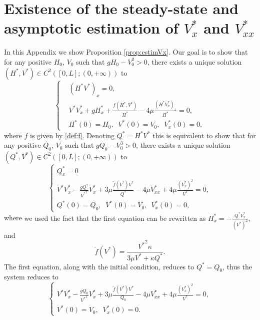 \documentclass[11pt]{article}
\begin{document}
\section{Existence of the steady-state and asymptotic estimation of $V^{*}_{x}$ {and $V^{*}_{xx}$}}
\label{app:estimVx}
In this Appendix we show Proposition \ref{prop:estimVx}.
Our goal is to show that for any positive $H_{0}$, $V_{0}$ such that $gH_{0}-V_{0}^{2}>0$, there exists a unique solution $(H^{*},V^{*})\in C^{2}([0,L];(0,+\infty))$ to
\begin{equation}
\label{eq:sys1HV}
\begin{cases}
&(H^{*}V^{*})_x = 0,\\
&V^{*}V_x^{*} + gH_x^{*} + \frac{f(H^{*}, V^{*})}{H^{*}} - 4 \mu  \frac{(H^{*}V_x^{*})_x}{H^{*}} = 0,\\
&H^{*}(0) = H_{0},\;\;V^{*}(0)=V_{0},\;\; 
V_{x}^{*}(0)=0,
\end{cases}
\end{equation}
where $f$ is given by \eqref{def:f}.
Denoting $Q^{*} = H^{*}V^{*}$ this is equivalent to show that for any positive $Q_{0}$, $V_{0}$ such that $g Q_{0}-V_{0}^{3}>0$, there exists a unique solution $(Q^{*}, V^{*})\in C^{2}([0,L];(0,+\infty))$ to
\begin{equation}
\label{eq:sys2QV}
\begin{cases}
Q_{x}^{*}= 0\\
V^{*}V_{x}^{*} - \frac{gQ^{*}}{{V^{*}}^{2}}V_{x}^{*} + 3\mu\frac{\tilde{f}(V^{*})V^{*}}{Q^{*}} - 4 \mu V_{xx}^{*} +4\mu \frac{(V_{x}^{*})^{2}}{V^{*}}= 0,\\
Q^{*}(0) = Q_{0},\;\;V^{*}(0) = V_{0},\;\ V^{*}_{x}(0) = 0,
\end{cases}
\end{equation}
where {we used the fact that the first equation can be rewritten as $H^{*}_x = - \frac{Q^{*} V^{*}_{x}}{(V^*)^{2}}$, and}
\begin{equation}
\label{eq:deftildef}
\tilde{f}(V^{*}) = \frac{{V^{*}}^{2}\kappa}{3\mu V^{*}+\kappa Q^{*}}.
\end{equation}
The first equation, {along with the initial condition}, reduces to $Q^{*}=Q_{0}$, thus the system reduces to
\begin{equation}
\label{eq:sys3}
\begin{cases}
V^{*}V_{x}^{*} - \frac{gQ_{0}}{{V^{*}}^{2}}V_{x}^{*} + 3\mu\frac{\tilde{f}(V^{*})V^{*}}{Q_{0}} - 4 \mu V_{xx}^{*} +4\mu \frac{(V_{x}^{*})^{2}}{V^{*}}= 0,\\
V^{*}(0) = V_{0}, \;\;V^{*}_{x}(0) = 0.
\end{cases}
\end{equation}
\end{document}
